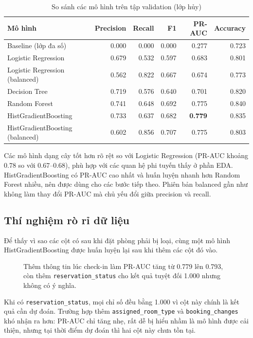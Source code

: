 \begin{table}[H]
\centering
\caption{So sánh các mô hình trên tập validation (lớp hủy)}
\label{tab:tab-models}
\begin{tabular}{lrrrrr}
\toprule
Mô hình & Precision & Recall & F1 & PR-AUC & Accuracy\\
\midrule
Baseline (lớp đa số) & 0.000 & 0.000 & 0.000 & 0.277 & 0.723\\
Logistic Regression & 0.679 & 0.532 & 0.597 & 0.683 & 0.801\\
Logistic Regression (balanced) & 0.562 & 0.822 & 0.667 & 0.674 & 0.773\\
Decision Tree & 0.719 & 0.576 & 0.640 & 0.701 & 0.820\\
Random Forest & 0.741 & 0.648 & 0.692 & 0.775 & 0.840\\
HistGradientBoosting & 0.733 & 0.637 & 0.682 & \textbf{0.779} & 0.835\\
HistGradientBoosting (balanced) & 0.602 & 0.856 & 0.707 & 0.775 & 0.803\\
\bottomrule
\end{tabular}
\end{table}

Các mô hình dạng cây tốt hơn rõ rệt so với Logistic Regression (PR-AUC khoảng 0.78 so với 0.67--0.68), phù hợp với các quan hệ
phi tuyến thấy ở phần EDA. HistGradientBoosting có PR-AUC cao nhất và huấn luyện nhanh hơn Random Forest nhiều,
nên được dùng cho các bước tiếp theo. Phiên bản balanced gần như không làm thay đổi PR-AUC mà chủ yếu đổi giữa precision và recall.

\subsection{Thí nghiệm rò rỉ dữ liệu}
Để thấy vì sao các cột có sau khi đặt phòng phải bị loại, cùng một mô hình HistGradientBoosting được huấn luyện lại sau khi thêm các cột đó vào.

\begin{figure}[H]
\centering
{}
\caption{Thêm thông tin lúc check-in làm PR-AUC tăng từ 0.779 lên 0.793, còn thêm \texttt{reservation\_status} cho kết quả tuyệt đối 1.000 nhưng không có ý nghĩa.}
\label{fig:tab-leakage}
\end{figure}

Khi có \texttt{reservation\_status}, mọi chỉ số đều bằng 1.000 vì cột này chính là kết quả cần dự đoán. Trường hợp thêm
\texttt{assigned\_room\_type} và \texttt{booking\_changes} khó nhận ra hơn: PR-AUC chỉ tăng nhẹ, rất dễ bị hiểu nhầm là mô hình
được cải thiện, nhưng tại thời điểm dự đoán thì hai cột này chưa tồn tại.

